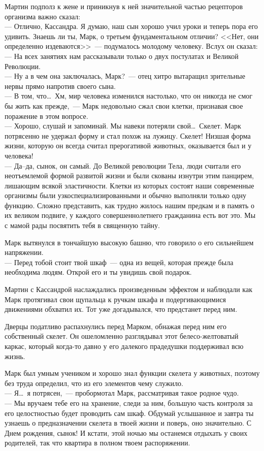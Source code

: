 Мартин подполз к жене и приникнув к ней значительной частью рецепторов 
организма важно сказал:\\
--- Отлично, Кассандра. Я думаю, наш сын хорошо учил уроки и теперь пора его 
удивить. Знаешь ли ты, Марк, о третьем фундаментальном отличии?
<<Нет, они определенно издеваются>>~--- подумалось молодому человеку. Вслух 
он сказал:\\
--- На всех занятиях нам рассказывали только о двух постулатах и Великой 
Революции.\\
--- Ну а в чем она заключалась, Марк?~--- отец хитро вытаращил зрительные 
нервы прямо напротив своего сына.\\
--- В том, что\ldots\ Хм, мир человека изменился настолько, что он никогда не 
смог бы жить как прежде,~--- Марк недовольно сжал свои клетки, признавая свое 
поражение в этом вопросе.\\
--- Хорошо, слушай и запоминай. Мы навеки потеряли свой\ldots\ Скелет.
Марк потрясенно не удержал форму и стал похож на лужицу. Скелет! Низшая форма 
жизни, которую он всегда считал прерогативой животных, оказывается был и у 
человека!\\
--- Да--да, сынок, он самый. До Великой революции Тела, люди считали его 
неотъемлемой формой развитой жизни и были скованы изнутри этим панцирем, 
лишающим всякой эластичности. Клетки из которых состоят наши современные 
организмы были узкоспециализированными и обычно выполняли только одну функцию. 
Сложно представить, как трудно жилось нашим предкам и в память о их великом 
подвиге, у каждого совершеннолетнего гражданина есть вот это. Мы с мамой рады 
посвятить тебя в священную тайну.

Марк вытянулся в тончайшую высокую башню, что говорило о его сильнейшем 
напряжении.\\
--- Перед тобой стоит твой шкаф~--- одна из вещей, которая прежде была 
необходима людям. Открой его и ты увидишь свой подарок.

Мартин с Кассандрой наслаждались произведенным эффектом и наблюдали как Марк 
протягивал свои щупальца к ручкам шкафа и подергивающимися движениями обхватил 
их. Тот уже догадывался, что предстанет перед ним.

Дверцы податливо распахнулись перед Марком, обнажая перед ним его собственный 
скелет. Он ошеломленно разглядывал этот белесо-желтоватый каркас, который 
когда-то давно у его далекого прадедушки поддерживал всю жизнь.

Марк был умным учеником и хорошо знал функции скелета у животных, поэтому без 
труда определил, что из его элементов чему служило.\\
--- Я\ldots\ я потрясен,~--- пробормотал Марк, рассматривая такое родное чудо.\\
--- Мы вручаем тебе его на хранение, следи за ним, большую часть контроля за 
его целостностью будет проводить сам шкаф. Обдумай услышанное и завтра ты 
узнаешь о предназначении скелета в твоей жизни и поверь, оно значительно. С 
Днем рождения, сынок! И кстати, этой ночью мы останемся отдыхать у своих 
родителей, так что квартира в полном твоем распоряжении.

